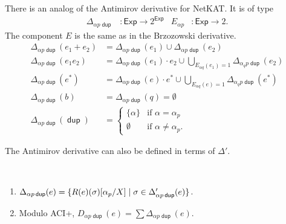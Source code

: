 \documentclass{article}
\newcommand\ssum{\mathop{\textstyle\sum}}
\newcommand\pdup{\mathop{\mathsf{dup}}}
\newcommand\Exp{\mathsf{Exp}}
\renewcommand\star{^{\textstyle *}}
\renewcommand\powerset[1]{2^{#1}}
\newcommand\clname{\mathrm{cl}}
\newcommand\cl[1]{\clname(#1)}
\begin{document}
There is an analog of the Antimirov derivative for NetKAT. It is of type
\begin{align*}
\Delta_{\alpha p\pdup} &: \Exp\to\powerset\Exp & E_{\alpha p} &: \Exp\to 2.
\end{align*}
The component $E$ is the same as in the Brzozowski derivative.
\begin{align*}
\Delta_{\alpha p\pdup}(e_1+e_2) &= \Delta_{\alpha p\pdup}(e_1) \cup \Delta_{\alpha p\pdup}(e_2)\\
\Delta_{\alpha p\pdup}(e_1e_2) &= \Delta_{\alpha p\pdup}(e_1)\cdot e_2 \cup \bigcup_{E_{\alpha q}(e_1)=1}\Delta_{\alpha_q p\pdup}(e_2)\\
\Delta_{\alpha p\pdup}(e\star) &= \Delta_{\alpha p\pdup}(e)\cdot e\star \cup \bigcup_{E_{\alpha q}(e)=1}\Delta_{\alpha_q p\pdup}(e\star)\\
\Delta_{\alpha p\pdup}(b) &= \Delta_{\alpha p\pdup}(q) = \emptyset\\
\Delta_{\alpha p\pdup}(\pdup) &= \begin{cases}
\{\alpha\} & \text{if $\alpha=\alpha_p$}\\
\emptyset & \text{if $\alpha\neq\alpha_p$.}
\end{cases}
\end{align*}

The Antimirov derivative can also be defined in terms of $\Delta'$.


\begin{lemma}
\label{eq:DDelta}\ 
\begin{enumerate}[{\upshape (i)}]
\item
$\Delta_{\alpha p\pdup}(e) = \set{\rep\sigma e\subst{\alpha_p}X}{\sigma\in\Delta'_{\alpha p\pdup}(e)}$.
\item
Modulo ACI+, $D_{\alpha p\pdup}(e) = \ssum\Delta_{\alpha p\pdup}(e)$.
\end{enumerate}
\end{lemma}
\end{document}
